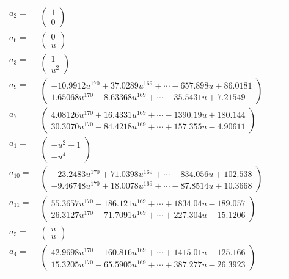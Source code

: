 \documentclass[1p]{elsarticle_modified}
\theoremstyle{definition}
\begin{document}
\begin{tabular}{m{7pt} m{180pt} m{7pt} m{180pt} }
\flushright $a_{2}=$&$\begin{pmatrix}1\\0\end{pmatrix}$ \\
\flushright $a_{6}=$&$\begin{pmatrix}0\\u\end{pmatrix}$ \\
\flushright $a_{3}=$&$\begin{pmatrix}1\\u^2\end{pmatrix}$ \\
\flushright $a_{9}=$&$\begin{pmatrix}-10.9912 u^{170}+37.0289 u^{169}+\cdots-657.898 u+86.0181\\1.65068 u^{170}-8.63368 u^{169}+\cdots-35.5431 u+7.21549\end{pmatrix}$ \\
\flushright $a_{7}=$&$\begin{pmatrix}4.08126 u^{170}+16.4331 u^{169}+\cdots-1390.19 u+180.144\\30.3070 u^{170}-84.4218 u^{169}+\cdots+157.355 u-4.90611\end{pmatrix}$ \\
\flushright $a_{1}=$&$\begin{pmatrix}- u^2+1\\- u^4\end{pmatrix}$ \\
\flushright $a_{10}=$&$\begin{pmatrix}-23.2483 u^{170}+71.0398 u^{169}+\cdots-834.056 u+102.538\\-9.46748 u^{170}+18.0078 u^{169}+\cdots-87.8514 u+10.3668\end{pmatrix}$ \\
\flushright $a_{11}=$&$\begin{pmatrix}55.3657 u^{170}-186.121 u^{169}+\cdots+1834.04 u-189.057\\26.3127 u^{170}-71.7091 u^{169}+\cdots+227.304 u-15.1206\end{pmatrix}$ \\
\flushright $a_{5}=$&$\begin{pmatrix}u\\u\end{pmatrix}$ \\
\flushright $a_{4}=$&$\begin{pmatrix}42.9698 u^{170}-160.816 u^{169}+\cdots+1415.01 u-125.166\\15.3205 u^{170}-65.5905 u^{169}+\cdots+387.277 u-26.3923\end{pmatrix}$ \\

\end{tabular}
\end{document}
